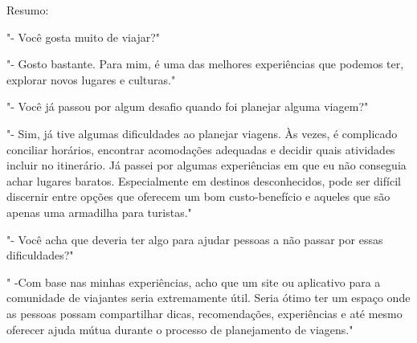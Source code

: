 \documentclass{article}
\begin{document}
Resumo:

"- Você gosta muito de viajar?"

"- Gosto bastante. Para mim, é uma das melhores experiências que podemos ter, explorar novos lugares e culturas."

"- Você já passou por algum desafio quando foi planejar alguma viagem?"

"- Sim, já tive algumas dificuldades ao planejar viagens. Às vezes, é complicado conciliar horários, encontrar acomodações adequadas e decidir quais atividades incluir no itinerário.
Já passei por algumas experiências em que eu não conseguia achar lugares baratos. Especialmente em destinos desconhecidos, pode ser difícil discernir entre opções que oferecem um bom custo-benefício e aqueles que são apenas uma armadilha para turistas."

"- Você acha que deveria ter algo para ajudar pessoas a não passar por essas dificuldades?"

" -Com base nas minhas experiências, acho que um site ou aplicativo para a comunidade de viajantes seria extremamente útil. Seria ótimo ter um espaço onde as pessoas possam compartilhar dicas, recomendações, experiências e até mesmo oferecer ajuda mútua durante o processo de planejamento de viagens."
\end{document}
